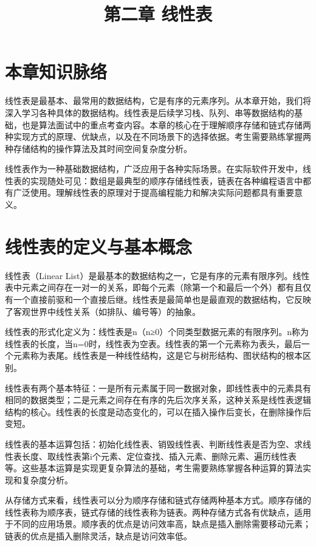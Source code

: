 \documentclass[12pt, a4paper]{article}
\title{\textbf{第二章 线性表}}
\author{}
\date{}
\begin{document}
\maketitle

\section*{本章知识脉络}

线性表是最基本、最常用的数据结构，它是有序的元素序列。从本章开始，我们将深入学习各种具体的数据结构。线性表是后续学习栈、队列、串等数据结构的基础，也是算法面试中的重点考查内容。本章的核心在于理解顺序存储和链式存储两种实现方式的原理、优缺点，以及在不同场景下的选择依据。考生需要熟练掌握两种存储结构的操作算法及其时间空间复杂度分析。

线性表作为一种基础数据结构，广泛应用于各种实际场景。在实际软件开发中，线性表的实现随处可见：数组是最典型的顺序存储线性表，链表在各种编程语言中都有广泛使用。理解线性表的原理对于提高编程能力和解决实际问题都具有重要意义。

\section{线性表的定义与基本概念}

线性表（Linear List）是最基本的数据结构之一，它是有序的元素有限序列。线性表中元素之间存在一对一的关系，即每个元素（除第一个和最后一个外）都有且仅有一个直接前驱和一个直接后继。线性表是最简单也是最直观的数据结构，它反映了客观世界中线性关系（如排队、编号等）的抽象。

线性表的形式化定义为：线性表是n（n≥0）个同类型数据元素的有限序列。n称为线性表的长度，当n=0时，线性表为空表。线性表的第一个元素称为表头，最后一个元素称为表尾。线性表是一种线性结构，这是它与树形结构、图状结构的根本区别。

线性表有两个基本特征：一是所有元素属于同一数据对象，即线性表中的元素具有相同的数据类型；二是元素之间存在有序的先后次序关系，这种关系是线性表逻辑结构的核心。线性表的长度是动态变化的，可以在插入操作后变长，在删除操作后变短。

线性表的基本运算包括：初始化线性表、销毁线性表、判断线性表是否为空、求线性表长度、取线性表第i个元素、定位查找、插入元素、删除元素、遍历线性表等。这些基本运算是实现更复杂算法的基础，考生需要熟练掌握各种运算的算法实现和复杂度分析。

从存储方式来看，线性表可以分为顺序存储和链式存储两种基本方式。顺序存储的线性表称为顺序表，链式存储的线性表称为链表。两种存储方式各有优缺点，适用于不同的应用场景。顺序表的优点是访问效率高，缺点是插入删除需要移动元素；链表的优点是插入删除灵活，缺点是访问效率低。
\end{document}
